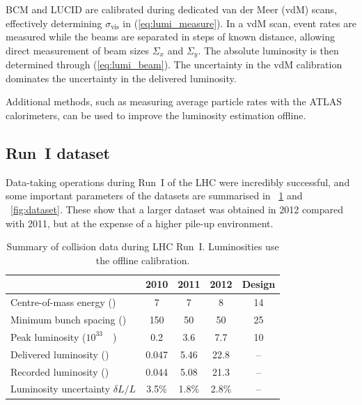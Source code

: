 \ac{BCM} and LUCID are calibrated during dedicated van der Meer (vdM) scans, effectively 
determining $\sigma_{\text{vis}}$ in (\ref{eq:lumi_measure}). In a vdM scan, event rates 
are measured while the beams are separated in steps of known distance, allowing direct 
measurement of beam sizes $\varSigma_x$ and $\varSigma_y$. The absolute luminosity is then 
determined through (\ref{eq:lumi_beam}). The uncertainty in the vdM calibration dominates 
the uncertainty in the delivered luminosity.

Additional methods, such as measuring average particle rates with the ATLAS calorimeters, 
can be used to improve the luminosity estimation offline.



\subsection{Run~I dataset}
\label{sec:dataset:dataset}

Data-taking operations during Run~I of the LHC were incredibly successful, and some 
important parameters of the \pp datasets are summarised in \Table~\ref{tab:dataset} and 
\Figure~\ref{fig:dataset}. These show that a larger dataset was obtained in 2012 compared 
with 2011, but at the expense of a higher pile-up environment.

\begin{table}[h]
	\begin{tabular}{l@{\hskip 0.3in}c@{\hskip 0.3in}c@{\hskip 0.3in}c@{\hskip 0.3in}c}
	& 2010 & 2011 & 2012 & Design \\
	\hline
	Centre-of-mass energy (\TeV)         & 7 & 7 & 8 & 14 \\
	Minimum bunch spacing (\nano\second) & 150 & 50 & 50 & 25 \\
	Peak luminosity (\unit{$10^{33}$}{\lumiunits}) & 0.2 & 3.6 & 7.7 & 10 \\
	Delivered luminosity (\invfb)       & 0.047 & 5.46 & 22.8 & -- \\
	Recorded luminosity (\invfb)        & 0.044 & 5.08 & 21.3 & -- \\
	Luminosity uncertainty $\delta L/L$ & 3.5\% & 1.8\% & 2.8\% & -- \\
	\end{tabular}
	\caption{Summary of \pp collision data during \ac{LHC} Run~I. Luminosities use the 
	offline calibration.}
	\label{tab:dataset}
\end{table}

